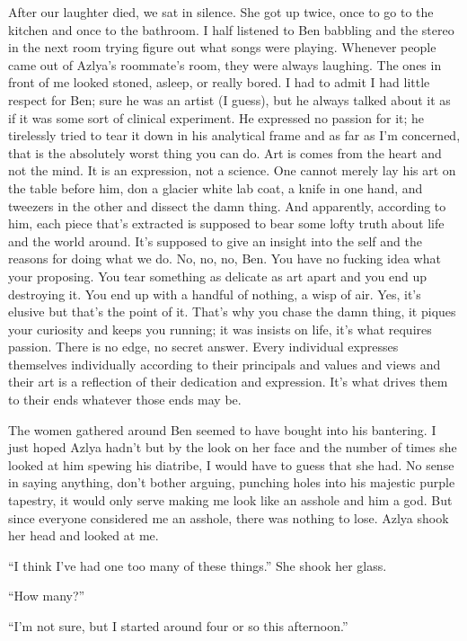 After our laughter died, we sat in silence. She got up twice, once to go
to the kitchen and once to the bathroom. I half listened to Ben babbling
and the stereo in the next room trying figure out what songs were
playing. Whenever people came out of Azlya's roommate's room, they were
always laughing. The ones in front of me looked stoned, asleep, or
really bored. I had to admit I had little respect for Ben; sure he was
an artist (I guess), but he always talked about it as if it was some
sort of clinical experiment. He expressed no passion for it; he
tirelessly tried to tear it down in his analytical frame and as far as
I'm concerned, that is the absolutely worst thing you can do. Art is
comes from the heart and not the mind. It is an expression, not a
science. One cannot merely lay his art on the table before him, don a
glacier white lab coat, a knife in one hand, and tweezers in the other
and dissect the damn thing. And apparently, according to him, each piece
that's extracted is supposed to bear some lofty truth about life and the
world around. It's supposed to give an insight into the self and the
reasons for doing what we do. No, no, no, Ben. You have no fucking idea
what your proposing. You tear something as delicate as art apart and you
end up destroying it. You end up with a handful of nothing, a wisp of
air. Yes, it's elusive but that's the point of it. That's why you chase
the damn thing, it piques your curiosity and keeps you running; it was
insists on life, it's what requires passion. There is no edge, no secret
answer. Every individual expresses themselves individually according to
their principals and values and views and their art is a reflection of
their dedication and expression. It's what drives them to their ends
whatever those ends may be.

The women gathered around Ben seemed to have bought into his bantering.
I just hoped Azlya hadn't but by the look on her face and the number of
times she looked at him spewing his diatribe, I would have to guess that
she had. No sense in saying anything, don't bother arguing, punching
holes into his majestic purple tapestry, it would only serve making me
look like an asshole and him a god. But since everyone considered me an
asshole, there was nothing to lose. Azlya shook her head and looked at
me.

``I think I've had one too many of these things.'' She shook her glass.

``How many?''

``I'm not sure, but I started around four or so this afternoon.''

